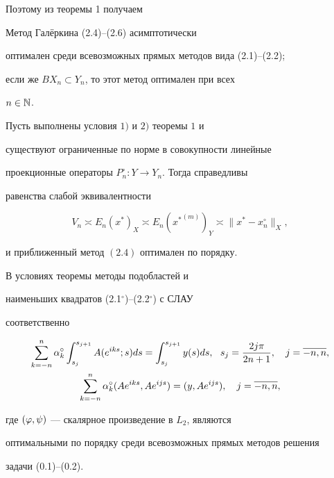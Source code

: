 Поэтому из теоремы 1 получаем





\begin{cornonum}


Метод Гал\"еркина (2.4)--(2.6) асимптотически


оптимален среди всевозможных прямых методов вида (2.1)--(2.2);


если же $BX_n\subset Y_n$, то этот метод оптимален при всех


$n\in\Bbb {N}$.


\end{cornonum}





\begin{thm}


Пусть выполнены условия $1)$ и $2)$ теоремы $1$ и


существуют ограниченные по норме в совокупности линейные


проекционные операторы $P_n^\circ:Y\to Y_n$. Тогда справедливы


равенства слабой эквивалентности


\begin{equation}


V_n\asymp E_n(x^*)_X \asymp E_n({x^*}^{(m)})_Y\asymp \|x^*-


x_n^\circ\|_X,


\end{equation}


и приближенный метод $(2.4)$ оптимален по порядку.


\end{thm}





\begin{cornonum}


В условиях теоремы методы подобластей и


наименьших квадратов (2.1$^\circ$)--(2.2$^\circ$) с СЛАУ


соответственно


\begin{gather}


\suml_{k=-n}^n \alpha_k^\circ \int_{s_j}^{s_{j+1}}A(e^{iks};s)ds


= \int_{s_j}^{s_{j+1}}y(s)ds, \ \


s_j = \frac{2j\pi}{2n+1},\quad j=\ol{-n,n}, \\


%


\suml_{k=-n}^n \alpha_k^\circ (A e^{iks}, A e^{ijs}) = (y, A e


^{ijs}), \quad j = \ol{-n,n},


\end{gather}


где $(\varphi,\psi)$ --- скалярное произведение в $L_2$, являются


оптимальными по порядку среди всевозможных прямых методов решения


задачи (0.1)--(0.2).


\end{cornonum}





